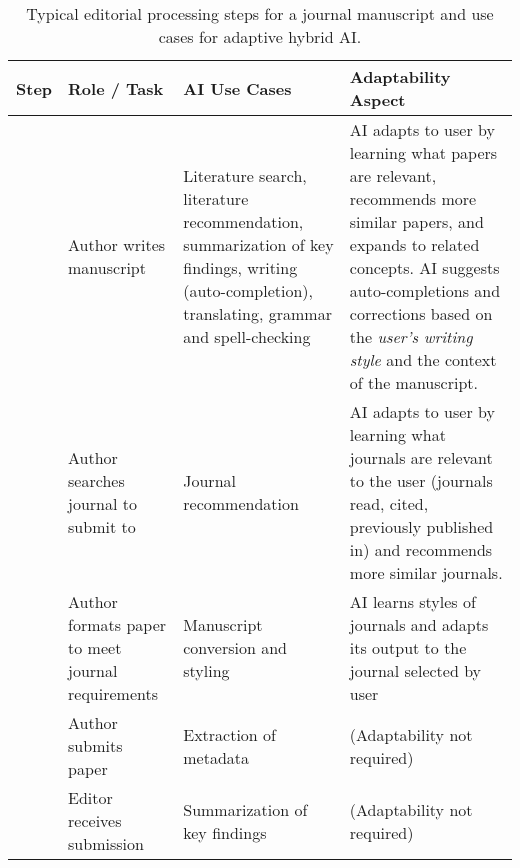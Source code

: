 \begin{landscape}
    \begin{table}[h!]
        \caption{
            Typical editorial processing steps for a journal manuscript and use cases for adaptive hybrid AI.
        }
        \label{tab:editorialProcess}

        \tiny
        \renewcommand{\arraystretch}{1.1}
        \small\centering
        \setlength\tabcolsep{8pt}
        \begin{tabularx}{\linewidth}{L{0.05} L{0.2} L{0.35} L{0.35}}
            \toprule
            \textbf{Step} & \textbf{Role / Task} & \textbf{AI Use Cases} & \textbf{Adaptability Aspect} \\
            \midrule

             & Author writes manuscript & 
                Literature search, literature recommendation, summarization of key findings, writing (auto-completion), translating, grammar and spell-checking &
                AI adapts to user by learning what papers are relevant, recommends more similar papers, and expands to related concepts. \linebreak
                AI suggests auto-completions and corrections based on the \textit{user's writing style} and the context of the manuscript.
                \\
            \midrule

             & Author searches journal to submit to & Journal recommendation &
                AI adapts to user by learning what journals are relevant to the user (journals read, cited, previously published in)
                and recommends more similar journals.
                \\
            \midrule

             & Author formats paper to meet journal requirements & Manuscript conversion and styling & 
                AI learns styles of journals and adapts its output to the journal selected by user \\
            \midrule

             & Author submits paper & Extraction of metadata & (Adaptability not required) \\
            \midrule
            
             & Editor receives submission & Summarization of key findings & (Adaptability not required) \\
            \midrule
            

\end{tabularx}
\end{table}
\end{landscape}
